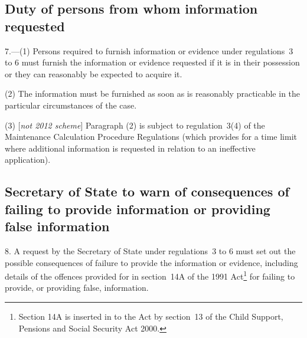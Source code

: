 \documentclass[12pt,a4paper]{article}
\begin{document}

\subsection[7. Duty of persons from whom information requested]{Duty of persons from whom information requested}

7.---(1)  Persons required to furnish information or evidence under regulations~3 to 6 must furnish the information or evidence requested if it is in their possession or they can reasonably be expected to acquire it.

(2) The information must be furnished as soon as is reasonably practicable in the particular circumstances of the case.

(3) [\emph{not 2012 scheme}] Paragraph (2) is subject to regulation~3(4) of the Maintenance Calculation Procedure Regulations (which provides for a time limit where additional information is requested in relation to an ineffective application).


\subsection[8. 
Secretary of State  %
to warn of consequences of failing to provide information or providing false information]{%
Secretary of State  %
to warn of consequences of failing to provide information or providing false information}

8.  A request by the 
Secretary of State  %
under regulations~3 to 6 must set out the possible consequences of failure to provide the information or evidence, including details of the offences provided for in section~14A of the 1991 Act\footnote{Section 14A is inserted in to the Act by section~13 of the Child Support, Pensions and Social Security Act 2000.} for failing to provide, or providing false, information.
\end{document}
